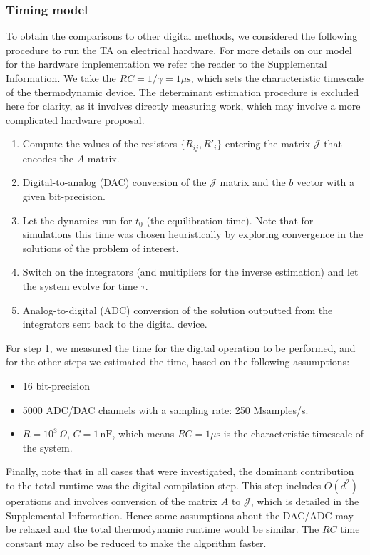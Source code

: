 \documentclass[prx,onecolumn,floatfix,longbibliography,notitlepage, nofootinbib,12pt]{revtex4-2}
\begin{document}
\subsubsection{Timing model}

To obtain the comparisons to other digital methods, we considered the following procedure to run the TA on electrical hardware. For more details on our model for the hardware implementation we refer the reader to the Supplemental Information. We take the $RC=1/\gamma = 1 \mu\text{s}$, which sets the characteristic timescale of the thermodynamic device. The determinant estimation procedure is excluded here for clarity, as it involves directly measuring work, which may involve a more complicated hardware proposal.
\begin{enumerate}
     \item Compute the values of the resistors $\{R_{ij}, R'_i\}$ entering the matrix $\mathcal{J}$ that encodes the $A$ matrix.
    \item Digital-to-analog (DAC) conversion of the $\mathcal{J}$ matrix and the $b$ vector with a given bit-precision.
    \item Let the dynamics run for $t_0$ (the equilibration time). Note that for simulations this time was chosen heuristically by exploring convergence in the solutions of the problem of interest.
    \item Switch on the integrators (and multipliers for the inverse estimation) and let the system evolve for time $\tau$.
    \item Analog-to-digital (ADC) conversion of the solution outputted from the integrators sent back to the digital device.
\end{enumerate}
For step 1, we measured the time for the digital operation to be performed, and for the other steps we estimated the time, based on the following assumptions:
\begin{itemize}
    \item 16 bit-precision
    \item 5000 ADC/DAC channels with a sampling rate: 250 Msamples/s.
    \item $R = 10^3 \,\Omega$, $C= 1 \,\text{nF}$, which means $RC = 1 \mu \text{s}$ is the characteristic timescale of the system.
\end{itemize}
Finally, note that in all cases that were investigated, the dominant contribution to the total runtime was the digital compilation step. This step includes $O(d^2)$ operations and involves conversion of the matrix $A$ to $\mathcal{J}$, which is detailed in the Supplemental Information. Hence some assumptions about the DAC/ADC may be relaxed and the total thermodynamic runtime would be similar. The $RC$ time constant may also be reduced to make the algorithm faster.
\end{document}
